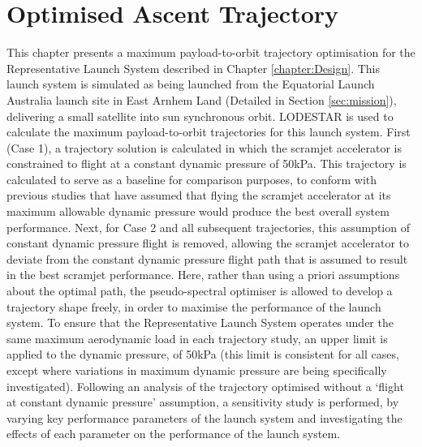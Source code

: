 
\cleardoublepage
\chapter{Optimised Ascent Trajectory}\label{chapter:Ascent}
	
	
This chapter presents a maximum payload-to-orbit trajectory optimisation for the Representative Launch System described in Chapter \ref{chapter:Design}. 
This launch system is simulated as being launched from the Equatorial Launch Australia launch site in East Arnhem Land (Detailed in Section \ref{sec:mission}), delivering a small satellite into sun synchronous orbit. LODESTAR is used to calculate the maximum payload-to-orbit trajectories for this launch system.
First (Case 1), a trajectory solution is calculated in which the scramjet accelerator is constrained to flight at a constant dynamic pressure of 50kPa. This trajectory is calculated to serve as a baseline for comparison purposes, to conform with previous studies that have assumed that flying the scramjet accelerator at its maximum allowable dynamic pressure would produce the best overall system performance\cite{Preller2017b}. 
Next, for Case 2 and all subsequent trajectories, this assumption of constant dynamic pressure flight is removed, allowing the scramjet accelerator to deviate from the constant dynamic pressure flight path that is assumed to result in the best scramjet performance. Here, rather than using a priori assumptions about the optimal path, the pseudo-spectral optimiser is allowed to develop a trajectory shape freely, in order to maximise the performance of the launch system. To ensure that the Representative Launch System operates under the same maximum aerodynamic load in each trajectory study, an upper limit is applied to the dynamic pressure, of 50kPa (this limit is consistent for all cases, except where variations in maximum dynamic pressure are being specifically investigated). 
Following an analysis of the trajectory optimised without a `flight at constant dynamic pressure' assumption, a sensitivity study is performed, by varying key performance parameters of the launch system and investigating the effects of each parameter on the performance of the launch system. 

